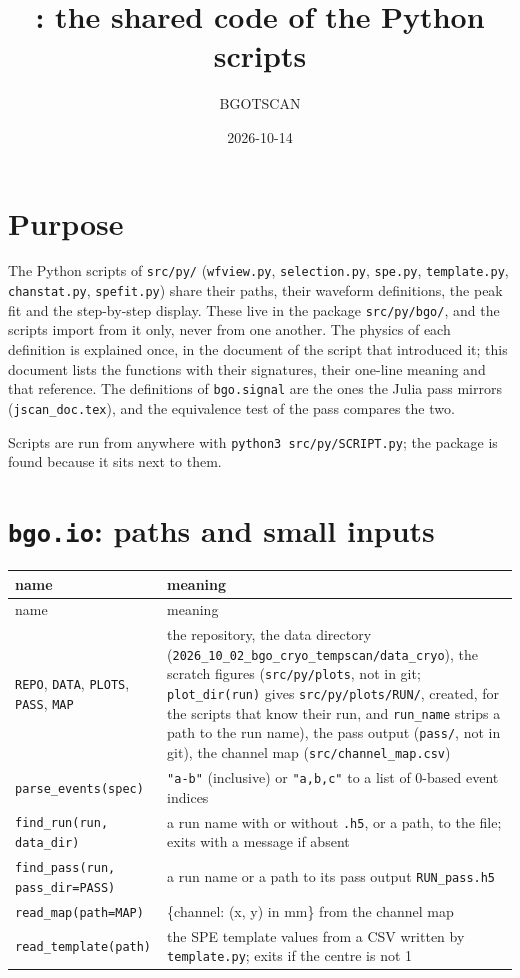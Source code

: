 \documentclass[11pt]{article}
\title{\code{bgo}: the shared code of the Python scripts}
\author{BGOTSCAN}
\date{2026-10-14}
\newcommand{\code}[1]{\texttt{#1}}
\begin{document}
\maketitle

\section{Purpose}

The Python scripts of \code{src/py/} (\code{wfview.py}, \code{selection.py},
\code{spe.py}, \code{template.py}, \code{chanstat.py}, \code{spefit.py})
share their paths, their waveform definitions, the peak fit and the
step-by-step display. These live in the package \code{src/py/bgo/}, and
the scripts import from it only, never from one another. The physics of
each definition is explained once, in the document of the script that
introduced it; this document lists the functions with their signatures,
their one-line meaning and that reference. The definitions of
\code{bgo.signal} are the ones the Julia pass mirrors
(\code{jscan\_doc.tex}), and the equivalence test of the pass compares the
two.

Scripts are run from anywhere with \code{python3 src/py/SCRIPT.py}; the
package is found because it sits next to them.

\section{\code{bgo.io}: paths and small inputs}

\begin{longtable}{l p{92mm}}
\toprule
name & meaning \\
\midrule
\endfirsthead
\toprule
name & meaning \\
\midrule
\endhead
\code{REPO}, \code{DATA}, \code{PLOTS}, \code{PASS}, \code{MAP} & the repository, the data directory (\code{2026\_10\_02\_bgo\_cryo\_tempscan/data\_cryo}), the scratch figures (\code{src/py/plots}, not in git; \code{plot\_dir(run)} gives \code{src/py/plots/RUN/}, created, for the scripts that know their run, and \code{run\_name} strips a path to the run name), the pass output (\code{pass/}, not in git), the channel map (\code{src/channel\_map.csv}) \\
\code{parse\_events(spec)} & \code{"a-b"} (inclusive) or \code{"a,b,c"} to a list of 0-based event indices \\
\code{find\_run(run, data\_dir)} & a run name with or without \code{.h5}, or a path, to the file; exits with a message if absent \\
\code{find\_pass(run, pass\_dir=PASS)} & a run name or a path to its pass output \code{RUN\_pass.h5} \\
\code{read\_map(path=MAP)} & \{channel: (x, y) in mm\} from the channel map \\
\code{read\_template(path)} & the SPE template values from a CSV written by \code{template.py}; exits if the centre is not 1 \\
\bottomrule
\end{longtable}
\end{document}
